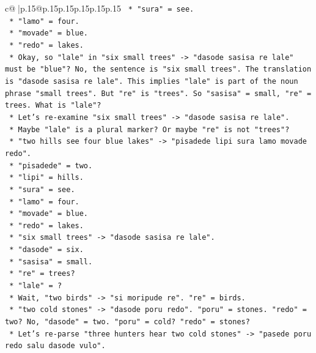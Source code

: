 \documentclass{article}
\begin{document}
{\begin{supertabular}{c@{$\;$}|p{.15\linewidth}@{}p{.15\linewidth}p{.15\linewidth}p{.15\linewidth}p{.15\linewidth}p{.15\linewidth}}
{{{\texttt{                    *   "sura" = see.} \\
\texttt{                    *   "lamo" = four.} \\
\texttt{                    *   "movade" = blue.} \\
\texttt{                    *   "redo" = lakes.} \\
\texttt{                *   Okay, so "lale" in "six small trees" {-}> "dasode sasisa re lale" must be "blue"? No, the sentence is "six small trees". The translation is "dasode sasisa re lale". This implies "lale" is part of the noun phrase "small trees". But "re" is "trees". So "sasisa" = small, "re" = trees. What is "lale"?} \\
\texttt{                *   Let's re{-}examine "six small trees" {-}> "dasode sasisa re lale".} \\
\texttt{                    *   Maybe "lale" is a plural marker? Or maybe "re" is not "trees"?} \\
\texttt{                    *   "two hills see four blue lakes" {-}> "pisadede lipi sura lamo movade redo".} \\
\texttt{                        *   "pisadede" = two.} \\
\texttt{                        *   "lipi" = hills.} \\
\texttt{                        *   "sura" = see.} \\
\texttt{                        *   "lamo" = four.} \\
\texttt{                        *   "movade" = blue.} \\
\texttt{                        *   "redo" = lakes.} \\
\texttt{                    *   "six small trees" {-}> "dasode sasisa re lale".} \\
\texttt{                        *   "dasode" = six.} \\
\texttt{                        *   "sasisa" = small.} \\
\texttt{                        *   "re" = trees?} \\
\texttt{                        *   "lale" = ?} \\
\texttt{                    *   Wait, "two birds" {-}> "si moripude re". "re" = birds.} \\
\texttt{                    *   "two cold stones" {-}> "dasode poru redo". "poru" = stones. "redo" = two? No, "dasode" = two. "poru" = cold? "redo" = stones?} \\
\texttt{                    *   Let's re{-}parse "three hunters hear two cold stones" {-}> "pasede poru redo salu dasode vulo".} \\
}}}
\end{supertabular}}
\end{document}
